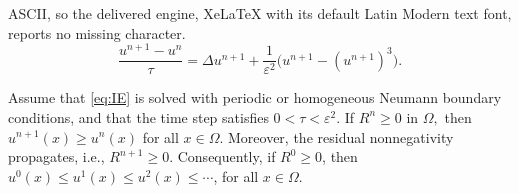 \documentclass[10pt,a4paper]{amsart}
\newcommand{\dt}{\tau}
\newcommand{\eps}{\varepsilon}
\begin{document}
ASCII, so the delivered engine, XeLaTeX with its default Latin Modern text font, reports no missing character.
\begin{equation}
    \frac{u^{n+1}-u^n}{\dt}
    =\Delta u^{n+1}+\frac{1}{\eps^2}\bigl(u^{n+1}-(u^{n+1})^3\bigr).
    \label{eq:IE}
\end{equation}

\begin{theorem}\label{thm:FIE-monotone}
Assume that \eqref{eq:IE} is solved with periodic or homogeneous Neumann boundary conditions, and that the time step satisfies
$0<\dt<\eps^2.$ If $R^n\ge0$ in $\Omega,$
then $u^{n+1}(x)\ge u^n(x)$ for all $x\in\Omega.$
Moreover, the residual nonnegativity propagates, i.e., $R^{n+1}\ge0$.
Consequently, if \(R^0\ge0\), then
$u^0(x)\le u^1(x)\le u^2(x)\le\cdots$, for all $x\in\Omega.$
\end{theorem}
\end{document}
